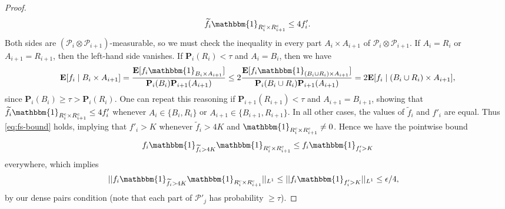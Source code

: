 \documentclass[reqno,11pt]{amsart}
\theoremstyle{definition}
\theoremstyle{remark}
\numberwithin{equation}{section}
\renewcommand{\P}{\mathbf{P}}
\newcommand{\E}{\mathbf{E}}
\newcommand{\mP}{\mathcal{P}}
\newcommand{\one}{\mathbbm{1}}
\renewcommand{\tilde}{\widetilde}
\begin{document}
\begin{proof}
\begin{equation} \label{eq:fs-bound}
    \tilde{f}_i \one_{R_i^c \times R_{i+1}^c} \le 4 f'_i.
\end{equation}
Both sides are $(\mP_i \otimes \mP_{i+1})$-measurable, so we must check the inequality in every part $A_i \times A_{i+1}$ of $\mP_i \otimes \mP_{i+1}$. If $A_i = R_i$ or $A_{i+1} = R_{i+1}$, then the left-hand side vanishes. If $\P_i(R_i) < \tau$ and $A_i = B_i$, then we have 
\[
    \E[f_i \mid B_i \times A_{i+1}] = \frac{\E[f_i \one_{B_i \times A_{i+1}}]}{\P_i(B_i)\P_{i+1}(A_{i+1})}\le 
    2\frac{\E[f_i \one_{(B_i \cup R_i) \times A_{i+1}}]}{\P_i(B_i \cup R_i)\P_{i+1}(A_{i+1})}
    =
    2\E[f_i \mid (B_i \cup R_i) \times A_{i+1}],
\]
since $\P_i(B_i) \ge \tau > \P_i(R_i)$. One can repeat this reasoning if $\P_{i+1}(R_{i+1}) < \tau$ and $A_{i+1} = B_{i+1}$, showing that $\tilde{f}_i \one_{R_i^c \times R_{i+1}^c} \le 4f'_i$ whenever $A_i \in \{B_i, R_i\}$ or $A_{i+1} \in \{B_{i+1}, R_{i+1}\}$. In all other cases, the values of $\tilde{f}_i$ and $f'_i$ are equal. Thus \cref{eq:fs-bound} holds, implying that $f'_i > K$ whenever $\tilde{f}_i > 4K$ and $\one_{R_i^c \times R_{i+1}^c} \neq 0$. Hence we have the pointwise bound
\[
    f_i\one_{\tilde{f}_i >4K} \one_{R_i^c \times R_{i+1}^c} 
    \le f_i \one_{f'_i >K}
\]
everywhere, which implies
\begin{equation} \label{eq:edges-third-term}
\begin{aligned}
    ||f_i\one_{\tilde{f}_i >4K} \one_{R_i^c \times R_{i+1}^c}||_{L^1} &\le ||f_i \one_{f'_i >K}||_{L^1} \le \epsilon/4,
\end{aligned}
\end{equation}
by our dense pairs condition (note that each part of $\mP'_j$ has probability $\ge \tau$).



\end{proof}
\end{document}
